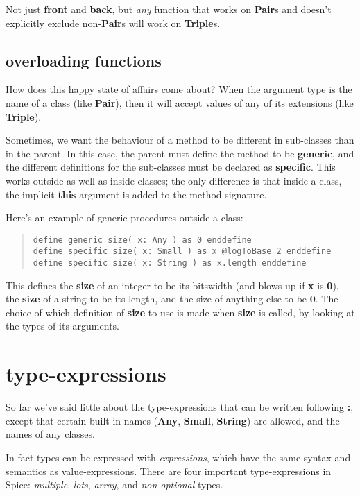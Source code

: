 \documentclass{report}
\begin{document}
Not just {\bf front} and {\bf back}, but {\em any} function that works on {\bf Pair}s and
doesn't explicitly exclude non-{\bf Pair}s will work on {\bf Triple}s.

\section{overloading functions}


How does this happy state of affairs come about? When the argument type is the
name of a class (like {\bf Pair}), then it will accept values of any of its
extensions (like {\bf Triple}).

Sometimes, we want the behaviour of a method to be different in sub-classes
than in the parent. In this case, the parent must define the method to be
{\bf generic}, and the different definitions for the sub-classes must be declared
as {\bf specific}. This works outside as well as inside classes; the only
difference is that inside a class, the implicit {\bf this} argument is added to
the method signature.

Here's an example of generic procedures outside a class:

\begin{quote}
\begin{verbatim}
define generic size( x: Any ) as 0 enddefine
define specific size( x: Small ) as x @logToBase 2 enddefine
define specific size( x: String ) as x.length enddefine
\end{verbatim}
\end{quote}


This defines the {\bf size} of an integer to be its bitswidth (and blows up if {\bf x}
is {\bf 0}), the {\bf size} of a string to be its length, and the size of anything
else to be {\bf 0}. The choice of which definition of {\bf size} to use is made when
{\bf size} is called, by looking at the types of its arguments.\chapter{type-expressions}


So far we've said little about the type-expressions that can be written
following {\bf :}, except that certain built-in names ({\bf Any}, {\bf Small}, {\bf String})
are allowed, and the names of any classes.

In fact types can be expressed with {\em expressions}, which have the same syntax
and semantics as value-expressions. There are four important type-expressions
in Spice: {\em multiple}, {\em lots}, {\em array}, and {\em non-optional} types.
\end{document}
